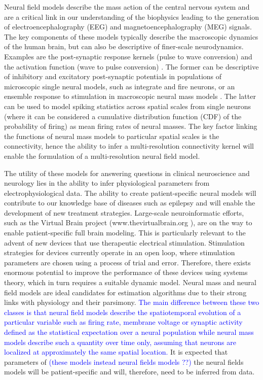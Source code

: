 \documentclass[review,authoryear,3p]{elsarticle}
\newcommand{\parham}[1]{\textcolor{blue}{#1}}
\begin{document}
Neural field models describe the mass action of the central nervous system and are a critical link in our understanding of the biophysics leading to the generation of  electroencephalography (EEG) and magnetoencephalography (MEG) signals. The key components of these models typically describe the macroscopic dynamics of the human brain, but can also be descriptive of finer-scale neurodynamics. Examples are the post-synaptic response kernels (pulse to wave conversion) and the activation function (wave to pulse conversion) \citep{Jirsa1996,Jirsa1997}. The former can be descriptive of inhibitory and excitatory post-synaptic potentials in populations of microscopic single neural models, such as integrate and fire neurons, or an ensemble response to stimulation in macroscopic neural mass models \citep{Stefanescu2008}. The latter can be used to model spiking statistics across spatial scales from single neurons (where it can be considered a cumulative distribution function (CDF) of the probability of firing) as mean firing rates of neural masses. The key factor linking the functions of neural mass models to particular spatial scales is the connectivity, hence the ability to infer a multi-resolution connectivity kernel will enable the formulation of a multi-resolution neural field model.  

The utility of these models for answering questions in clinical neuroscience and neurology lies in the ability to infer physiological parameters from electrophysiological data. The ability to create patient-specific neural models will contribute to our knowledge base of diseases such as epilepsy and will enable the development of new treatment strategies. Large-scale neuroinformatic efforts, such as the Virtual Brain project (www.thevirtualbrain.org \citep{Jirsa2010}), are on the way to enable patient-specific full brain modeling. This is particularly relevant to the advent of new devices that use therapeutic electrical stimulation. Stimulation strategies for devices currently operate in an open loop, where stimulation parameters are chosen using a process of trial and error. Therefore, there exists enormous potential to improve the performance of these devices using systems theory, which in turn requires a suitable dynamic model. Neural mass and neural field models are ideal candidates for estimation algorithms due to their strong links with physiology and their parsimony. \parham{The main difference between these two classes is that neural field models describe the spatiotemporal evolution of a particular variable such as firing rate, membrane voltage or synaptic activity defined as the statistical expectation over a neural population while neural mass models describe such a quantity over time only, assuming that neurons are localized at approximately the same spatial location.} It is expected that parameters of \parham{(these models instead neural fields models ??)} the neural fields models will be patient-specific and will, therefore, need to be inferred from data. 
\end{document}
